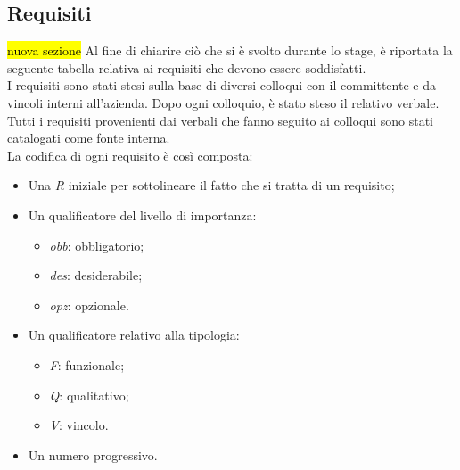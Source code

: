 \subsection{Requisiti}
\hl{nuova sezione}
Al fine di chiarire ciò che si è svolto durante lo stage, è riportata la seguente tabella relativa ai requisiti che devono essere soddisfatti.\\
I requisiti sono stati stesi sulla base di diversi colloqui con il committente e da vincoli interni all'azienda. Dopo ogni  colloquio, è stato steso il relativo verbale.\\ Tutti i requisiti provenienti dai verbali che fanno seguito ai colloqui sono stati catalogati come fonte interna.\\
La codifica di ogni requisito è così composta:
\begin{itemize}
	\item Una \textit{R} iniziale per sottolineare il fatto che si tratta di un requisito;
	\item Un qualificatore del livello di importanza:
	\begin{itemize}
		\item \textit{obb}: obbligatorio;
		\item \textit{des}: desiderabile;
		\item \textit{opz}: opzionale.
	\end{itemize}
	\item Un qualificatore relativo alla tipologia:
	\begin{itemize}
		\item \textit{F}: funzionale;
		\item \textit{Q}: qualitativo;
		\item \textit{V}: vincolo.
	\end{itemize}
	\item Un numero progressivo.
\end{itemize}

